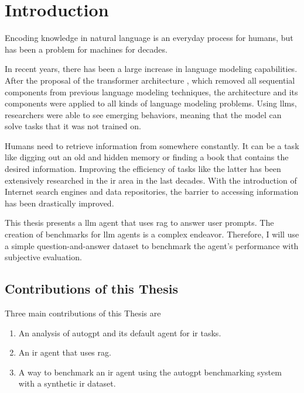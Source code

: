 \documentclass[../main.tex]{subfiles}
\begin{document}
\chapter{Introduction}
\label{ch:introduction}

Encoding knowledge in natural language is an everyday process for humans,
but has been a problem for machines for decades.

In recent years, there has been a large increase in language modeling capabilities.
After the proposal of the transformer architecture \cite{Vaswani2017},
which removed all sequential components from previous language modeling techniques,
the architecture and its components were applied to all kinds of language modeling problems.
Using \glspl{llm}, researchers were able to
see emerging behaviors, meaning that the model can solve tasks that it was not trained on.

Humans need to retrieve information from somewhere constantly.
It can be a task like digging out an old and hidden memory
or finding a book that contains the desired information.
Improving the efficiency of tasks like the latter
has been extensively researched in the \gls{ir} area in the last decades.
With the introduction of Internet search engines and data repositories,
the barrier to accessing information has been drastically improved.

This thesis presents a \gls{llm} agent that uses \gls{rag} to answer user prompts.
The creation of benchmarks for \gls{llm} agents is a complex endeavor.
Therefore, I will use a simple question-and-answer dataset
to benchmark the agent's performance with subjective evaluation.

\section{Contributions of this Thesis}

Three main contributions of this Thesis are

\begin{enumerate}
    \item An analysis of \gls{autogpt} and its default agent for \gls{ir} tasks.
    \item An \gls{ir} agent that uses \gls{rag}.
    \item A way to benchmark an \gls{ir} agent using the \gls{autogpt} benchmarking system with a synthetic \gls{ir} dataset.
\end{enumerate}
\end{document}

